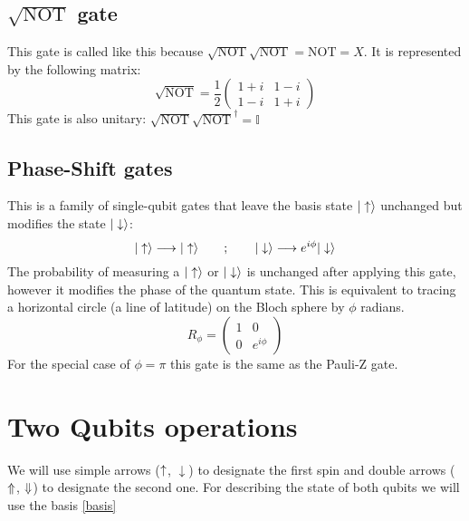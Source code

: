 \subsection{$\sqrt{\text{NOT}}$ gate}
This gate is called like this because $\sqrt{\text{NOT}}\sqrt{\text{NOT}}=\text{NOT}=X$. It is represented by the following matrix:
\begin{equation}
  \sqrt{\text{NOT}} = \frac{1}{2}\left(\begin{array}{cc}
  1+i & 1-i \\
  1-i & 1+i
  \end{array}\right)
\end{equation}
This gate is also unitary: $\sqrt{\text{NOT}}\sqrt{\text{NOT}}^{\dagger}=\mathbb{I}$

\subsection{Phase-Shift gates}
This is a family of single-qubit gates that leave the basis state $|\uparrow\rangle$ unchanged but modifies the state $|\downarrow\rangle$:
\begin{equation}
  |\uparrow\rangle \longrightarrow |\uparrow\rangle \quad\quad;\quad\quad
  |\downarrow\rangle \longrightarrow e^{i\phi}|\downarrow\rangle
\end{equation}
The probability of measuring a $|\uparrow\rangle$ or $|\downarrow\rangle$ is unchanged after applying this gate, however it modifies the phase of the quantum state. This is equivalent to tracing a horizontal circle (a line of latitude) on the Bloch sphere by $\phi$ radians.
\begin{equation}
  R_{\phi} = \left(\begin{array}{cc}
  1 & 0 \\
  0 & e^{i\phi}
  \end{array}\right)
\end{equation}
For the special case of $\phi = \pi$ this gate is the same as the Pauli-Z gate.

\section{Two Qubits operations}
We will use simple arrows ($\uparrow$, $\downarrow$) to designate the first spin and double arrows ($\Uparrow$, $\Downarrow$) to designate the second one.
For describing the state of both qubits we will use the basis \eqref{basis}


